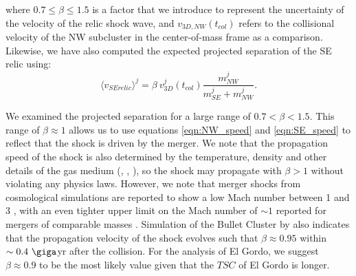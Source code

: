 where $0.7 \leq \beta \leq 1.5$ is a factor that we introduce to represent the
uncertainty of the velocity of the relic shock wave, and $v_{3D, NW}(t_{col})$ refers to the collisional velocity of
the NW subcluster in the center-of-mass frame as a comparison. 
Likewise, we have also computed the expected projected separation of the SE
relic using:  
\begin{equation}
	\label{eqn:SE_speed}
	\langle v_{SE relic} \rangle^j = \beta~v^j_{3D}(t_{col}) \frac{m^j_{NW}}{m^j_{SE} + m^j_{NW}}. 
\end{equation}
\par 
We examined the projected separation for a large range of $0.7 <\beta <
1.5$. This range of $\beta \approx 1$ allows us to use  
equations \ref{eqn:NW_speed} and \ref{eqn:SE_speed} to reflect that the
shock is driven by the merger. We note that the propagation speed of the
shock is also determined by the temperature, density and other details of
the gas medium (\citealt{Prokhorov2007}, \citealt{Springel2007},
\citealt{Milosavljevic07}), so the shock may propagate with $\beta > 1$ without violating any physics
laws. However, we note that merger shocks from cosmological
simulations are reported to show a low Mach number between 1 and 3
\citep{Bruggen2011}, with an even tighter upper limit on the Mach number of
$\sim 1$ reported for mergers of comparable masses \citep{Markevitch2007}.    
Simulation of the Bullet Cluster by \cite{Springel2007} also indicates that the
propagation velocity of the shock evolves such that $\beta \approx 0.95$ within
$\sim 0.4~\giga$yr after the collision. For the analysis of El Gordo,
we suggest $\beta \approx 0.9$ to be the most likely value given that the $TSC$ of
El Gordo is longer. 
\label{sec:positionprior}

